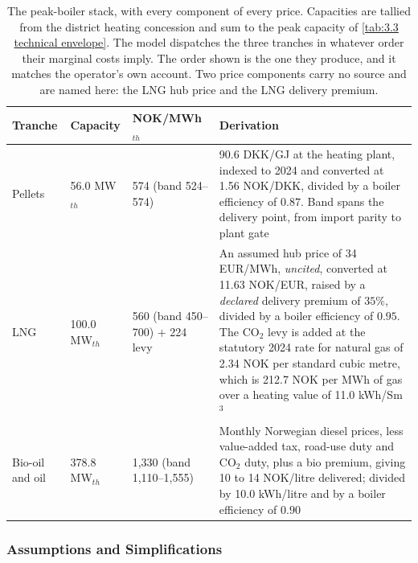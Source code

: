 \begin{table}[h]
\centering
\caption{The peak-boiler stack, with every component of every price. Capacities are tallied from the district heating concession \cite{nve_konsesjonssak_2026} and sum to the peak capacity of \autoref{tab:3.3 technical envelope}. The model dispatches the three tranches in whatever order their marginal costs imply. The order shown is the one they produce, and it matches the operator's own account. Two price components carry no source and are named here: the LNG hub price and the LNG delivery premium.}
\small
\begin{tabular}{p{1.9cm} p{1.7cm} p{2.7cm} p{6.8cm}}
\toprule
\textbf{Tranche} & \textbf{Capacity} & \textbf{NOK/MWh$_{th}$} & \textbf{Derivation} \\
\midrule
Pellets & 56.0 MW$_{th}$ & 574 \newline (band 524--574) & 90.6 DKK/GJ at the heating plant, indexed to 2024 and converted at 1.56 NOK/DKK, divided by a boiler efficiency of $0.87$. Band spans the delivery point, from import parity to plant gate \\
\addlinespace
LNG & 100.0 MW$_{th}$ & 560 \newline (band 450--700) \newline $+$ 224 levy & An assumed hub price of 34 EUR/MWh, \emph{uncited}, converted at 11.63 NOK/EUR, raised by a \emph{declared} delivery premium of $35\%$, divided by a boiler efficiency of $0.95$. The CO$_2$ levy is added at the statutory 2024 rate for natural gas of 2.34 NOK per standard cubic metre, which is 212.7 NOK per MWh of gas over a heating value of 11.0 kWh/Sm$^3$ \\
\addlinespace
Bio-oil and oil & 378.8 MW$_{th}$ & 1{,}330 \newline (band 1{,}110--1{,}555) & Monthly Norwegian diesel prices, less value-added tax, road-use duty and CO$_2$ duty, plus a bio premium, giving 10 to 14 NOK/litre delivered; divided by 10.0 kWh/litre and by a boiler efficiency of $0.90$ \\
\bottomrule
\end{tabular}
\label{tab:3.4.2 peak stack}
\end{table}

\subsubsection{Assumptions and Simplifications}
\label{3-subsec:3.4.3 assumptions}

